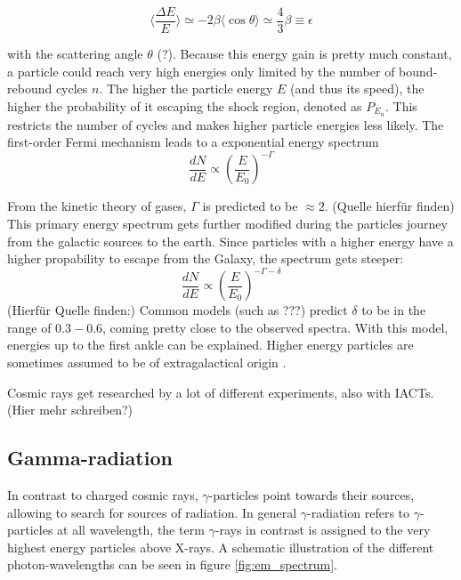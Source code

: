 \begin{equation}
	\langle \frac{\Delta E}{E} \rangle 
	\simeq -2\beta \langle \cos{\theta} \rangle
	\simeq \frac{4}{3}\beta
	\equiv \epsilon
\end{equation}

with the scattering angle $\theta$ (?).
Because this energy gain is pretty much constant, a particle could reach very high 
energies only limited by the number of bound-rebound cycles $n$.
The higher the particle energy $E$ (and thus its speed), 
the higher the probability of it escaping the shock region, denoted 
as $P_{E_n}$.
This restricts the number of cycles and makes higher particle energies 
less likely.
The first-order Fermi mechanism leads to a exponential energy spectrum 
\begin{equation}
	\frac{dN}{dE} \propto \left(\frac{E}{E_0}\right)^{-\Gamma}
\end{equation}

From the kinetic theory of gases, $\Gamma$ is predicted to 
be $\approx 2$.
(Quelle hierfür finden)
This primary energy spectrum gets further modified during the particles 
journey from the galactic sources to the earth.
Since particles with a higher energy have a higher propability to escape 
from the Galaxy, the spectrum gets steeper:
\begin{equation}
	\frac{dN}{dE} \propto \left(\frac{E}{E_0}\right)^{-\Gamma-\delta}
\end{equation}
(Hierfür Quelle finden:)
Common models (such as ???) predict $\delta$ to be in the range of 
$0.3-0.6$, coming pretty close to the observed spectra.
With this model, energies up to the first ankle can be explained.
Higher energy particles are sometimes assumed to be of extragalactical origin
\cite{Baring:1997ka}.

Cosmic rays get researched by a lot of different experiments,
also with IACTs. 
(Hier mehr schreiben?)


\subsection{Gamma-radiation}
In contrast to charged cosmic rays, $\gamma$-particles point towards
their sources, allowing to search for sources of radiation.
In general $\gamma$-radiation refers to $\gamma$-particles at all wavelength,
the term $\gamma$-rays in contrast is assigned to the very highest energy particles
above X-rays.
A schematic illustration of the different photon-wavelengths
can be seen in figure \ref{fig:em_spectrum}.

